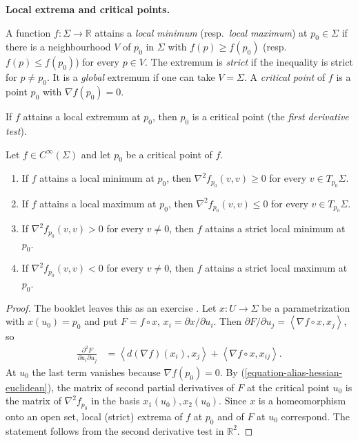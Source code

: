 \medskip\noindent
{\bf Local extrema and critical points.}

\begin{definition}
\label{definition-alias-extrema}
A function $f:\Sigma\to\mathbb{R}$ attains
a \emph{local minimum} (resp.\
\emph{local maximum}) at $p_0\in\Sigma$ if
there is a neighbourhood $V$ of $p_0$ in
$\Sigma$ with $f(p)\geq f(p_0)$ (resp.\
$f(p)\leq f(p_0)$) for every $p\in V$.
The extremum is \emph{strict} if the
inequality is strict for $p\neq p_0$. It
is a \emph{global} extremum if one can
take $V=\Sigma$. A \emph{critical point}
of $f$ is a point $p_0$ with
$\nabla f(p_0)=0$.
\end{definition}

If $f$ attains a local extremum at
$p_0$, then $p_0$ is a critical point
(the \emph{first derivative test}).

\begin{theorem}
\label{theorem-alias-second-derivative-test}
Let $f\in C^\infty(\Sigma)$ and let $p_0$
be a critical point of $f$.
\begin{enumerate}
\item If $f$ attains a local minimum at
$p_0$, then $\nabla^2f_{p_0}(v,v)\geq 0$
for every $v\in T_{p_0}\Sigma$.
\item If $f$ attains a local maximum at
$p_0$, then $\nabla^2f_{p_0}(v,v)\leq 0$
for every $v\in T_{p_0}\Sigma$.
\item If $\nabla^2f_{p_0}(v,v)>0$ for
every $v\neq 0$, then $f$ attains a strict
local minimum at $p_0$.
\item If $\nabla^2f_{p_0}(v,v)<0$ for
every $v\neq 0$, then $f$ attains a strict
local maximum at $p_0$.
\end{enumerate}
\end{theorem}

\begin{proof}
The booklet leaves this as an exercise
\cite[Theorem 1.4, p.~9]{alias2006analisis}.
Let $x:U\to\Sigma$ be a parametrization
with $x(u_0)=p_0$ and put $F=f\circ x$,
$x_i=\partial x/\partial u_i$. Then
$\partial F/\partial u_j=\left\langle{}
\nabla f\circ x,x_j\right\rangle{}$, so
$$
\begin{aligned}
\frac{\partial^2F}{\partial u_i
\partial u_j}
&=\left\langle{}
d(\nabla f)(x_i),x_j\right\rangle{}
+\left\langle{} \nabla f\circ x,
x_{ij}\right\rangle{}.
\end{aligned}
$$
At $u_0$ the last term vanishes because
$\nabla f(p_0)=0$. By
(\ref{equation-alias-hessian-euclidean}),
the matrix of second partial derivatives
of $F$ at the critical point $u_0$ is the
matrix of $\nabla^2f_{p_0}$ in the basis
$x_1(u_0),x_2(u_0)$. Since $x$ is a
homeomorphism onto an open set, local
(strict) extrema of $f$ at $p_0$ and of
$F$ at $u_0$ correspond. The statement
follows from the second derivative test
in $\mathbb{R}^2$.
\end{proof}

